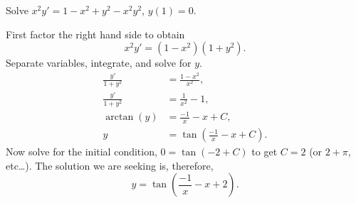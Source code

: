 \documentclass[12pt]{book}
\begin{document}
\begin{example}
Solve $x^2y' = 1 - x^2+y^2 - x^2y^2$, $y(1) = 0$.

First factor the right hand side to obtain
\begin{equation*}
x^2y' = (1 - x^2)(1+y^2) .
\end{equation*}
Separate variables, integrate, and solve for $y$.
\begin{align*}
\frac{y'}{1+y^2} & = \frac{1 - x^2}{x^2} , \\
\frac{y'}{1+y^2} & = \frac{1}{x^2} - 1 , \\
\operatorname{arctan} (y) & = \frac{-1}{x} - x + C , \\
y & = \tan \left(\frac{-1}{x} - x + C\right) .
\end{align*}
Now solve for the initial condition, $0 = \tan(-2+C)$ to get $C=2$ (or $2 +
\pi$, etc\ldots).  The solution we are seeking is, therefore,
\begin{equation*}
y = \tan \left(\frac{-1}{x} - x + 2 \right) .
\end{equation*}
\end{example}
\end{document}
